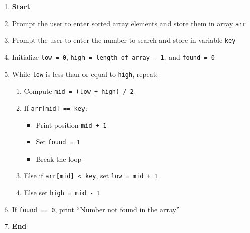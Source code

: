 \begin{enumerate}
    \item \textbf{Start}
    \item Prompt the user to enter sorted array elements and store them in array \texttt{arr}
    \item Prompt the user to enter the number to search and store in variable \texttt{key}
    \item Initialize \texttt{low = 0}, \texttt{high = length of array - 1}, and \texttt{found = 0}
    \item While \texttt{low} is less than or equal to \texttt{high}, repeat:
    \begin{enumerate}[label*=\arabic*.]
        \item Compute \texttt{mid = (low + high) / 2}
        \item If \texttt{arr[mid] == key}:
        \begin{itemize}
            \item Print position \texttt{mid + 1}
            \item Set \texttt{found = 1}
            \item Break the loop
        \end{itemize}
        \item Else if \texttt{arr[mid] < key}, set \texttt{low = mid + 1}
        \item Else set \texttt{high = mid - 1}
    \end{enumerate}
    \item If \texttt{found == 0}, print ``Number not found in the array''
    \item \textbf{End}
\end{enumerate}

